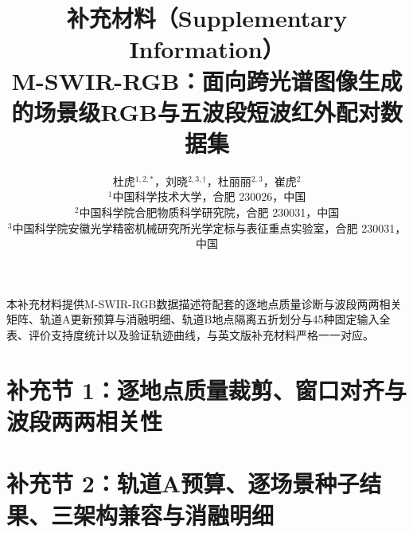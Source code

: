 \documentclass[UTF8,a4paper,10pt]{ctexart}
\title{\textbf{补充材料（Supplementary Information）}\\[0.35em]\large M-SWIR-RGB：面向跨光谱图像生成的场景级RGB与五波段短波红外配对数据集}
\author{杜虎$^{1,2,*}$，刘晓$^{2,3,\dagger}$，杜丽丽$^{2,3}$，崔虎$^{2}$\\[0.3em]
\small $^{1}$中国科学技术大学，合肥 230026，中国\\
\small $^{2}$中国科学院合肥物质科学研究院，合肥 230031，中国\\
\small $^{3}$中国科学院安徽光学精密机械研究所光学定标与表征重点实验室，合肥 230031，中国}
\date{}
\begin{document}
\maketitle

本补充材料提供M-SWIR-RGB数据描述符\cite{du2026mswirrgb_data}配套的逐地点质量诊断与波段两两相关矩阵、轨道A更新预算与消融明细、轨道B地点隔离五折划分与45种固定输入全表、评价支持度统计以及验证轨迹曲线，与英文版补充材料严格一一对应。

\section*{补充节 1：逐地点质量裁剪、窗口对齐与波段两两相关性}

\begin{table}[htbp]\centering\footnotesize\setlength{\tabcolsep}{3pt}
\caption{逐地点的像素裁剪比例与模态间灰度对齐统计（4:1窗口）。}\label{tab:s-quality-scene-zh}

\end{table}

\begin{table}[htbp]\centering\small
\caption{五个SWIR波段两两Pearson相关系数在十个地点上的分布。}\label{tab:s-quality-corr-zh}
\vspace{1pt}{\footnotesize\noindent 在每个地点成图几何有效区域内每隔7个有效像素抽样计算Pearson系数，汇总十地点的最小值、中位数与最大值。\par}

\end{table}

\clearpage
\section*{补充节 2：轨道A预算、逐场景种子结果、三架构兼容与消融明细}
\end{document}
